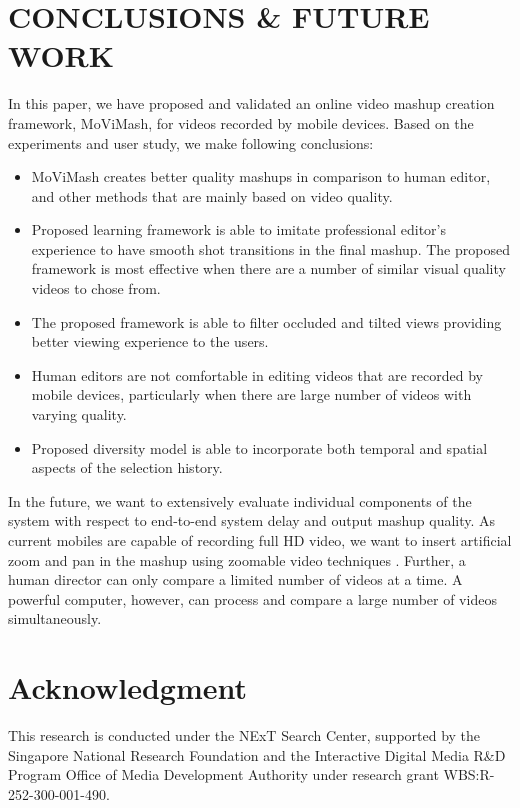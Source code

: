 \documentclass{sig-alternate-05-2015}
\begin{document}
\section{CONCLUSIONS \& FUTURE WORK}
In this paper, we have proposed and validated an online video
mashup creation framework, MoViMash, for videos recorded by
mobile devices. Based on the experiments and user study, we make
following conclusions:
\begin{itemize}
\item MoViMash creates better quality mashups in comparison to
human editor, and other methods that are mainly based on
video quality.
\item Proposed learning framework is able to imitate professional
editor's experience to have smooth shot transitions in the final mashup. The proposed framework is most effective when there are a number of similar visual quality videos to chose
from.
\item The proposed framework is able to filter occluded and tilted
views providing better viewing experience to the users.
\item Human editors are not comfortable in editing videos that are
recorded by mobile devices, particularly when there are large
number of videos with varying quality.
\item Proposed diversity model is able to incorporate both temporal and spatial aspects of the selection history.
\end{itemize}
In the future, we want to extensively evaluate individual components of the system with respect to end-to-end system delay and
output mashup quality. As current mobiles are capable of recording full HD video, we want to insert artificial zoom and pan in the
mashup using zoomable video techniques \cite{11}. Further, a human
director can only compare a limited number of videos at a time.
A powerful computer, however, can process and compare a large
number of videos simultaneously.

\section*{Acknowledgment}
This research is conducted under the NExT Search Center, supported by the Singapore National Research Foundation and the Interactive Digital Media R\&D Program Office of Media Development Authority under research grant WBS:R-252-300-001-490.





%


%
%
\end{document}
